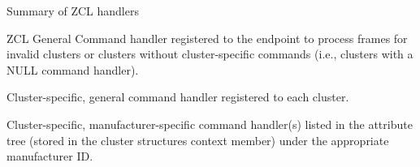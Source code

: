 \begin{DoxyParagraph}{Summary of Z\+CL handlers}

\begin{DoxyItemize}
\item Z\+CL General Command handler registered to the endpoint to process frames for invalid clusters or clusters without cluster-\/specific commands (i.\+e., clusters with a N\+U\+LL command handler).
\item Cluster-\/specific, general command handler registered to each cluster.
\item Cluster-\/specific, manufacturer-\/specific command handler(s) listed in the attribute tree (stored in the cluster structure\textquotesingle{}s context member) under the appropriate manufacturer ID. 
\end{DoxyItemize}
\end{DoxyParagraph}
